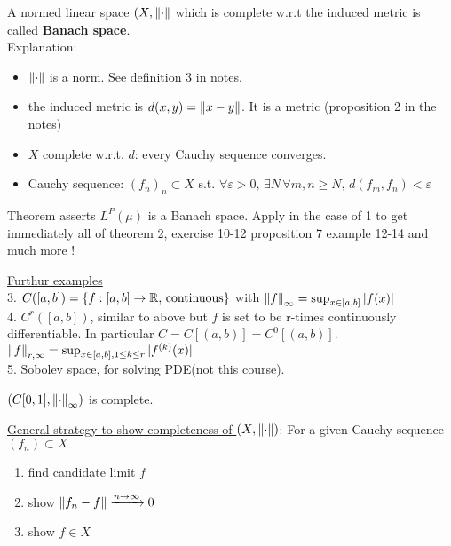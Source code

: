 \documentclass{article}
\begin{document}
\begin{definition}
	A normed linear space $(X,\left\|{\cdot}\right\|$ which is complete w.r.t the induced metric is called \textbf{Banach space}.\\
	Explanation:
	\begin{itemize}
		\item $\left\|{\cdot}\right\|$ is a norm. See definition 3 in notes.
		\item the induced metric is $d(x,y)=\left\|{x-y}\right\|$. It is a metric (proposition 2 in the notes) %
		\item $X$ complete w.r.t. $d$: every Cauchy sequence converges.
		\item Cauchy sequence: $(f_n)_n\subset X$ s.t. $\forall \varepsilon>0,\,\exists N\,\forall m,n\geq N,\,d(f_m,f_n)<\varepsilon$
	\end{itemize}
\end{definition}

\begin{remark}
	Theorem asserts $L^P(\mu)$ is a Banach space. Apply in the case of 1 to get immediately all of theorem 2, exercise 10-12 proposition 7 example 12-14 and much more
	!

\end{remark}

\underline{Furthur examples}\\
3. $C([a,b])=\{f:[a,b]\to\mathbb{R},\,\text{continuous}\}$ with $\left\|{f}\right\|_\infty=\sup_{x\in[a,b]}|f(x)|$\\
4. $C^r([a,b])$, similar to above but $f$ is set to be r-times continuously differentiable. In particular $C=C[(a,b)]=C^0[(a,b)]$.  $\left\|{f}\right\|_{r,\infty}=\sup_{x\in[a,b],1\leq k\leq r}|f^{(k)}(x)|$\\
5. Sobolev space, for solving PDE(not this course).

\begin{proposition}
	$(C[0,1],\left\|{\cdot}\right\|_\infty)$ is complete.
\end{proposition}
\underline{General strategy to show completeness of  $(X,\left\|{\cdot}\right\|)$}: For a given Cauchy sequence $(f_n)\subset X$
\begin{enumerate}
\item  find candidate limit $f$
\item  show $\left\|{f_n-f}\right\|\xrightarrow{n\to\infty}0$
\item  show $f\in X$
\end{enumerate}
	
\end{document}
